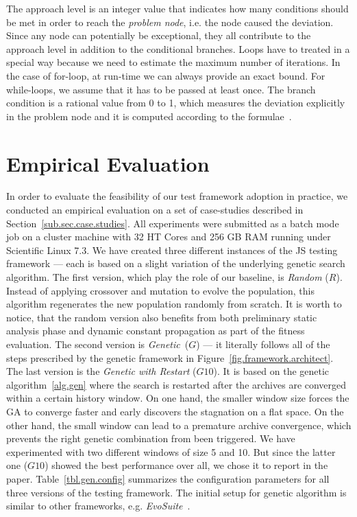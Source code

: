 \documentclass[sigconf,review, anonymous]{acmart}
\begin{document}
The approach level is an integer value that indicates how many conditions should be met in order to reach the \emph{problem node}, i.e. the node caused the deviation. Since any node can potentially be exceptional, they all contribute to the approach level in addition to the conditional branches. Loops have to treated in a special way because we need to estimate the maximum number of iterations. In the case of for-loop, at run-time we can always provide an exact bound. For while-loops, we assume that it has to be passed at least once. The branch condition is a rational value from 0 to 1, which measures the deviation explicitly in the problem node and it is computed according to the formulae~\cite{tracey1998automated}.
 
\section{Empirical Evaluation}
\label{sec.evaluation}

In order to evaluate the feasibility of our test framework adoption in practice, we conducted an empirical evaluation on a set of case-studies described in Section~\ref{sub.sec.case.studies}. All experiments were submitted as a batch mode job on a cluster machine with 32 HT Cores and 256 GB RAM running under Scientific Linux 7.3. We have created three different instances of the JS testing framework --- each is based on a slight variation of the underlying genetic search algorithm. The first version, which play the role of our baseline, is \emph{Random} ($R$). Instead of applying crossover and mutation to evolve the population, this algorithm regenerates the new population randomly from scratch. It is worth to notice, that the random version also benefits from both preliminary static analysis phase and dynamic constant propagation as part of the fitness evaluation. The second version is \emph{Genetic}~($G$) --- it literally follows all of the steps prescribed by the genetic framework in Figure~\ref{fig.framework.architect}. The last version is the \emph{Genetic with Restart} ($G10$). It is based on the genetic algorithm~\ref{alg.gen} where the search is restarted after the archives are converged within a certain history window. On one hand, the smaller window size forces the GA to converge faster and early discovers the stagnation on a flat space. On the other hand, the small window can lead to a premature archive convergence, which prevents the right genetic combination from been triggered. We have experimented with two different windows of size 5 and 10. But since the latter one ($G10$) showed the best performance over all, we chose it to report in the paper. Table~\ref{tbl.gen.config} summarizes the configuration parameters for all three versions of the testing framework. The initial setup for genetic algorithm is similar to other frameworks, e.g. \emph{EvoSuite}~\cite{evosuite}. 
\end{document}
